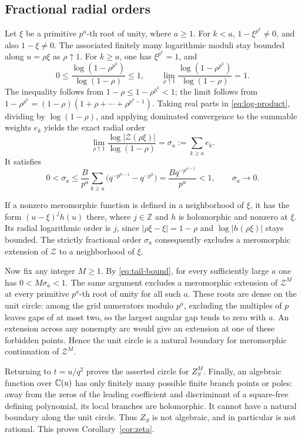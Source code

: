 \subsection{Fractional radial orders}

Let $\xi$ be a primitive $p^a$-th root of unity, where $a\ge1$.
For $k<a$, $1-\xi^{p^k}\ne0$, and also $1-\xi\ne0$. The associated
finitely many logarithmic moduli stay bounded along $u=\rho\xi$ as
$\rho\uparrow1$. For $k\ge a$, one has $\xi^{p^k}=1$, and
\begin{equation}\label{eq:domination}
 0\le\frac{\log(1-\rho^{p^k})}{\log(1-\rho)}\le1,
 \qquad
 \lim_{\rho\uparrow1}
 \frac{\log(1-\rho^{p^k})}{\log(1-\rho)}=1.
\end{equation}
The inequality follows from $1-\rho\le1-\rho^{p^k}<1$;
the limit follows from
$1-\rho^{p^k}=(1-\rho)(1+\rho+\cdots+\rho^{p^k-1})$.
Taking real parts in \eqref{eq:log-product}, dividing by
$\log(1-\rho)$, and applying dominated convergence to the summable
weights $e_k$ yields the exact radial order
\begin{equation}\label{eq:radial-order}
 \lim_{\rho\uparrow1}
 \frac{\log|\mathcal Z(\rho\xi)|}{\log(1-\rho)}
 =\sigma_a:=\sum_{k\ge a}e_k.
\end{equation}
It satisfies
\begin{equation}\label{eq:tail-bound}
 0<\sigma_a\le
 \frac{B}{p^a}\sum_{k\ge a}
       \bigl(q^{-p^{k-1}}-q^{-p^k}\bigr)
 =\frac{Bq^{-p^{a-1}}}{p^a}<1,
 \qquad \sigma_a\longrightarrow0.
\end{equation}

If a nonzero meromorphic function is defined in a neighborhood of
$\xi$, it has the form $(u-\xi)^j h(u)$ there, where $j\in\mathbb Z$
and $h$ is holomorphic and nonzero at $\xi$. Its radial logarithmic
order is $j$, since $|\rho\xi-\xi|=1-\rho$ and
$\log|h(\rho\xi)|$ stays bounded. The strictly fractional order
$\sigma_a$ consequently excludes a meromorphic extension of
$\mathcal Z$ to a neighborhood of $\xi$.

Now fix any integer $M\ge1$. By \eqref{eq:tail-bound}, for every
sufficiently large $a$ one has $0<M\sigma_a<1$. The same argument
excludes a meromorphic extension of $\mathcal Z^M$ at every primitive
$p^a$-th root of unity for all such $a$. These roots are dense on the
unit circle: among the grid numerators modulo $p^a$, excluding the
multiples of $p$ leaves gaps of at most two, so the largest angular
gap tends to zero with $a$. An extension across any nonempty arc would
give an extension at one of these forbidden points. Hence the unit
circle is a natural boundary for meromorphic continuation of
$\mathcal Z^M$.

Returning to $t=u/q^2$ proves the asserted circle for $Z_S^M$.
Finally, an algebraic function over $\mathbb C(u)$ has only finitely many
possible finite branch points or poles: away from the zeros of the
leading coefficient and discriminant of a square-free defining
polynomial, its local branches are holomorphic. It cannot have a
natural boundary along the unit circle. Thus $Z_S$ is not algebraic,
and in particular is not rational. This proves
Corollary~\ref{cor:zeta}.
